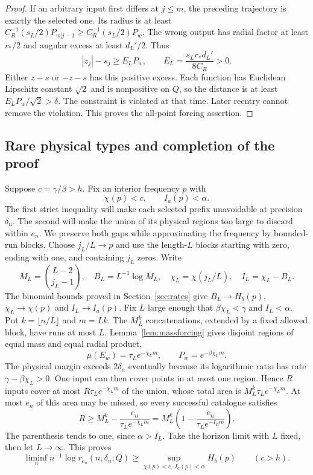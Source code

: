 \documentclass[11pt]{amsart}
\theoremstyle{definition}
\theoremstyle{remark}
\numberwithin{equation}{section}
\begin{document}
\begin{proof}
If an arbitrary input first differs at $j\le m$, the preceding
trajectory is exactly the selected one. Its radius is at least
$C_R^{-1}(s_L/2)P_{w|j-1}\ge C_R^{-1}(s_L/2)P_w$.
The wrong output has radial factor at least $r_*/2$ and angular
excess at least $d_L'/2$. Thus
\begin{equation}\label{eq:massmargin}
|z_j|-s_j\ge E_LP_w,\qquad
                         E_L=\frac{s_Lr_*d_L'}{8C_R}>0.
\end{equation}
Either $z-s$ or $-z-s$ has this positive excess. Each function
has Euclidean Lipschitz constant $\sqrt2$ and is nonpositive on
$Q$, so the distance is at least $E_LP_w/\sqrt2>\delta$.
The constraint is violated at that time. Later reentry cannot
remove the violation. This proves the all-point forcing assertion.
\end{proof}

\subsection{Rare physical types and completion of the proof}
Suppose $c=\gamma/\beta>h$. Fix an interior frequency $p$ with
\begin{equation}\label{eq:strictprobtype}
\chi(p)<c,\qquad I_a(p)<\alpha.
\end{equation}
The first strict inequality will make each selected prefix
unavoidable at precision $\delta_n$. The second will make the
union of its physical regions too large to discard within $e_n$.
We preserve both gaps while approximating the frequency by
bounded-run blocks.
Choose $j_L/L\to p$ and use the length-$L$ blocks starting with
zero, ending with one, and containing $j_L$ zeros. Write
\[
M_L=\binom{L-2}{j_L-1},\quad B_L=L^{-1}\log M_L,
\quad\chi_L=\chi(j_L/L),\quad I_L=\chi_L-B_L.
\]
The binomial bounds proved in Section~\ref{sec:rates} give
$B_L\to H_b(p)$, $\chi_L\to\chi(p)$ and $I_L\to I_a(p)$.
Fix $L$ large enough that $\beta\chi_L<\gamma$ and $I_L<\alpha$.
Put $k=\lfloor n/L\rfloor$ and $m=Lk$.
The $M_L^k$ concatenations, extended by a fixed allowed block,
have runs at most $L$. Lemma~\ref{lem:massforcing} gives disjoint
regions of equal mass and equal radial product,
\[
\mu(E_w)=\tau_Le^{-\chi_Lm},\qquad P_w=e^{-\beta\chi_Lm}.
\]
The physical margin exceeds $2\delta_n$ eventually because its
logarithmic ratio has rate $\gamma-\beta\chi_L>0$.
One input can then cover points in at most one region. Hence $R$
inputs cover at most $R\tau_Le^{-\chi_Lm}$ of the union, whose
total area is $M_L^k\tau_Le^{-\chi_Lm}$. At most $e_n$ of this
area may be missed, so every successful catalogue satisfies
\begin{equation}\label{eq:rarecount}
R\ge M_L^k-\frac{e_n}{\tau_Le^{-\chi_Lm}}
 =M_L^k\left(1-\frac{e_n}{\tau_Le^{-I_Lm}}\right).
\end{equation}
The parenthesis tends to one, since $\alpha>I_L$.
Take the horizon limit with $L$ fixed, then let $L\to\infty$.
This proves
\begin{equation}\label{eq:strictlower}
\liminf_n n^{-1}\log r_{e_n}(n,\delta_n;Q)
 \ge\sup_{\chi(p)<c,\ I_a(p)<\alpha}H_b(p)\qquad(c>h).
\end{equation}
\end{document}
